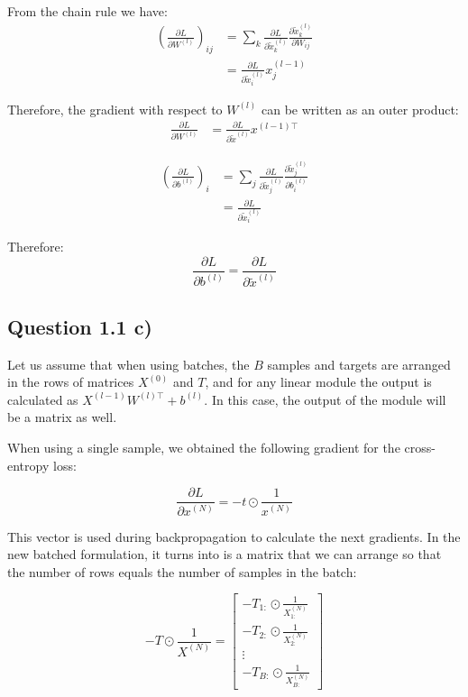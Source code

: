 \documentclass{article}
\begin{document}
From the chain rule we have:
\begin{align}
\left(\frac{\partial L}{\partial W^{(l)}}\right)_{ij} &= \sum_k\frac{\partial L}{\partial \tilde{x}^{(l)}_k}\frac{\partial \tilde{x}^{(l)}_k}{\partial W_{ij}}\\
&= \frac{\partial L}{\partial \tilde{x}^{(l)}_i}x^{(l-1)}_j
\end{align}

Therefore, the gradient with respect to $W^{(l)}$ can be written as an outer product:
\begin{align}
\frac{\partial L}{\partial W^{(l)}} &= \frac{\partial L}{\partial\tilde{x}^{(l)}}x^{(l-1)\top}
\end{align}

\begin{align}
\left(\frac{\partial L}{\partial b^{(l)}}\right)_i &= \sum_j \frac{\partial L}{\partial\tilde{x}^{(l)}_j} \frac{\partial\tilde{x}^{(l)}_j}{\partial b^{(l)}_i}\\
&=
\frac{\partial L}{\partial\tilde{x}^{(l)}_i}
\end{align}

Therefore:
\begin{equation}
\frac{\partial L}{\partial b^{(l)}} = \frac{\partial L}{\partial\tilde{x}^{(l)}}
\end{equation}

\subsection*{Question 1.1 c)}

Let us assume that when using batches, the $B$ samples and targets are arranged in the rows of matrices $X^{(0)}$ and $T$, and for any linear module the output is calculated as $X^{(l-1)}W^{(l)\top} + b^{(l)}$. In this case, the output of the module will be a matrix as well.

When using a single sample, we obtained the following gradient for the cross-entropy loss:

\begin{equation*}
\frac{\partial L}{\partial x^{(N)}} = -t\odot\frac{1}{x^{(N)}}
\end{equation*}

This vector is used during backpropagation to calculate the next gradients. In the new batched formulation, it turns into is a matrix that we can arrange so that the number of rows equals the number of samples in the batch:

\begin{equation}
-T\odot \frac{1}{X^{(N)}} = 
\begin{bmatrix}
-T_{1:}\odot\frac{1}{X^{(N)}_{1:}}\\
-T_{2:}\odot\frac{1}{X^{(N)}_{2:}}\\
\vdots\\
-T_{B:}\odot\frac{1}{X^{(N)}_{B:}}
\end{bmatrix}
\end{equation}
\end{document}
